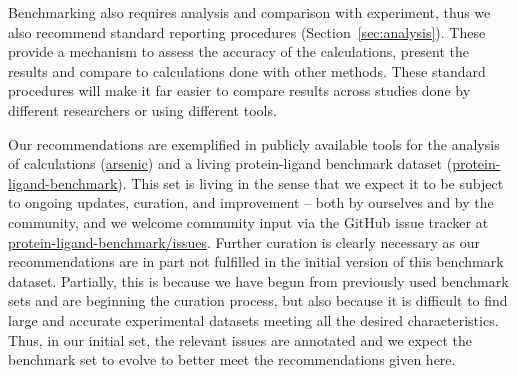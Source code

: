 \documentclass[9pt,bestpractices,pubversion]{livecoms}
\begin{document}
Benchmarking also requires analysis and comparison with experiment, thus we also recommend standard reporting procedures (Section~\ref{sec:analysis}). These provide a mechanism to assess the accuracy of the calculations, present the results and compare to calculations done with other methods. These standard procedures will make it far easier to compare results across studies done by different researchers or using different tools.

Our recommendations are exemplified in publicly available tools for the analysis of calculations (\href{http://github.com/OpenFreeEnergy/arsenic}{arsenic})
and a living protein-ligand benchmark dataset (\href{http://github.com/openforcefield/protein-ligand-benchmark}{protein-ligand-benchmark}).
%
This set is living in the sense that we expect it to be subject to ongoing updates, curation, and improvement -- both by ourselves and by the community, and we welcome community input via the GitHub issue tracker at \href{http://github.com/openforcefield/protein-ligand-benchmark/issues}{protein-ligand-benchmark/issues}. Further curation is clearly necessary as our recommendations are in part not fulfilled in the initial version of this benchmark dataset. Partially, this is because we have begun from previously used benchmark sets and are beginning the curation process, but also because it is difficult to find large and accurate experimental datasets meeting all the desired characteristics. Thus, in our initial set, the relevant issues are annotated and we expect the benchmark set to evolve to better meet the recommendations given here.
\end{document}
